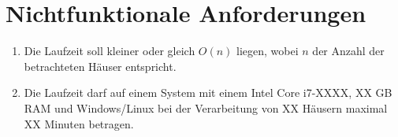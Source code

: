 \section{Nichtfunktionale Anforderungen}
\begin{enumerate}[label=Req-N-\arabic*:]
    \item Die Laufzeit soll kleiner oder gleich \(O(n)\) liegen, wobei \(n\) der Anzahl der betrachteten Häuser entspricht.
    \item Die Laufzeit darf auf einem System mit einem Intel Core i7-XXXX, XX GB RAM und Windows/Linux bei der Verarbeitung von XX Häusern maximal XX Minuten betragen.
\end{enumerate}


